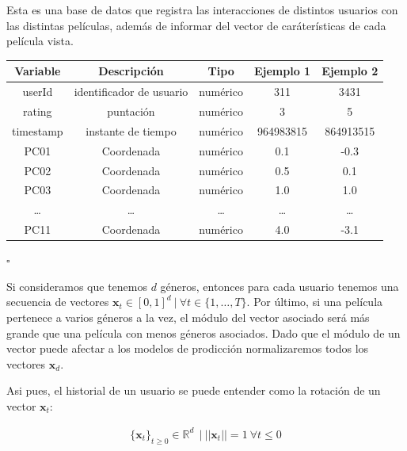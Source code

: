 \begin{db}\label{user_movies_features}
    Esta es una base de datos que registra las interacciones de distintos usuarios con las distintas películas, además de informar del vector de caráterísticas de cada película vista.
    \begin{center}
        \begin{tabular}{|c|c|c|c|c|}
        \hline
        \textbf{Variable} & \textbf{Descripción} & \textbf{Tipo} & \textbf{Ejemplo 1} & \textbf{Ejemplo 2} \\ 
        \hline
            userId & identificador de usuario   & numérico & 311 & 3431 \\  
        \hline
            rating & puntación  & numérico & 3 & 5 \\
        \hline
        timestamp & instante de tiempo  & numérico & 964983815 & 864913515 \\        
        \hline
        PC01  & Coordenada & numérico &  0.1 &  -0.3      \\
        PC02  & Coordenada & numérico &  0.5 &  0.1     \\
        PC03  & Coordenada & numérico &  1.0 &  1.0      \\
        \dots & \dots                     &  \dots &  \dots &  \dots    \\        PC11  & Coordenada & numérico &  4.0 &  -3.1      \\
            \hline
        \end{tabular}
    \end{center}
    \hfill$\square$         
\end{db}



Si consideramos que tenemos $d$ géneros, entonces para cada usuario tenemos una secuencia de vectores $\bm{x}_t \in [0,1]^d \ | \ \forall t \in \{ 1,\dots,T\}$. Por último, si una película pertenece a varios géneros a la vez, el módulo del vector asociado será más grande que una película con menos géneros asociados. Dado que el módulo de un vector puede afectar a los modelos de prodicción normalizaremos todos los vectores $\bm{x}_d$. 

Asi pues, el historial de un usuario se puede entender como la rotación de un vector $\bm{x}_t$:

\begin{gather}
    \{ \bm{x}_t  \}_{t \geq0} \in \mathbb{R}^d \ \ | \ ||\bm{x}_t|| = 1 \ \forall t \leq 0
\end{gather}



